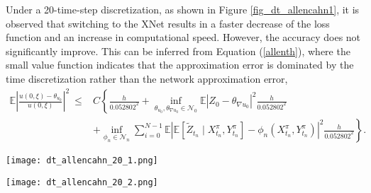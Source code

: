 \documentclass[11pt]{article}
\begin{document}
Under a 20-time-step discretization, as shown in Figure \ref{fig_dt_allencahn1}, it is observed that switching to the XNet results in a faster decrease of the loss function and an increase in computational speed. However, the accuracy does not significantly improve. This can be inferred from Equation (\ref{allenth}), where the small value function indicates that the approximation error is dominated by the time discretization rather than the network approximation error,
\begin{equation}\label{allenth}
	\begin{aligned}
		\mathbb{E}\left|\frac{{u(0, \xi)-\theta_{{u_0}}}}{{u(0,\xi)}}  \right|^2\
		\leq &C\left\{ \frac{h}{0.052802^2} +\inf _{\theta_{{u_0}},\theta_{\nabla{u_0}} \in \mathcal{N}_0}  \mathbb{E}\left| Z_0-\theta_{\nabla{u_0}} \right|^2  \frac{h}{0.052802^2} \right.\\
		&\left. +  \inf _{\phi_n \in \mathcal{N}_n} \sum_{i=0}^{N-1} \mathbb{E}\left|\mathbb{E}\left[\tilde{Z}_{t_n} \mid X_{t_n}^\pi, Y_{t_n}^\pi\right]-\phi_n\left(X_{t_n}^\pi, Y_{t_n}^\pi\right)\right|^2 \frac{h}{0.052802^2}\right\}.
	\end{aligned}
\end{equation}

\begin{figure*}
	\centering
	\begin{minipage}[t]{0.493\linewidth}
		\centering
		\texttt{[image: dt\_allencahn\_20\_1.png]}
		\label{fig_dt_allencahn_20:first}
	\end{minipage}%
	\hfill
	\begin{minipage}[t]{0.5\linewidth}
		\centering
		\texttt{[image: dt\_allencahn\_20\_2.png]}
		\label{fig_dt_allencahn_20:second}
	\end{minipage}
	\vspace{-0.7cm}
	\centering
	\caption{Comparison of Two Network Architectures for Solving the Allen-Cahn Equation under 20-step-time Discretization}
	\label{fig_dt_allencahn1}
\end{figure*}
\end{document}
